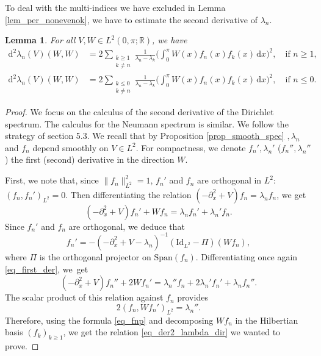 \documentclass[JEP,XML,SOM,Unicode,NoEqCountersInSection,published]{cedram}
\newtheorem{lemma}[theorem]{Lemma}
\theoremstyle{definition}
\begin{document}
To deal with the multi-indices we have excluded in Lemma \ref{lem_per_nonevenok}, we have to estimate the second derivative of $\lambda_n$.
\begin{lemma}
\label{lem_der2_lamb_abs}For all $V,W\in L^2(0,\pi;\mathbb{R})$, we have
\begin{align}
\label{eq_der2_lambda_dir}
\mathrm{d}^2\lambda_n(V)(W,W) &= 2\sum_{\substack{k \geq 1\\ k\neq n}} \frac1{\lambda_n - \lambda_k} \biggl(\int_0^\pi W(x) f_n(x) f_k(x) \, \mathrm{d}x \biggr)^2, \quad \text{if } n\geq 1,
\\
\label{eq_der2_lambda_neu}
\mathrm{d}^2\lambda_n(V)(W,W) &= 2\sum_{\substack{k \leq 0\\ k\neq n}} \frac1{\lambda_n - \lambda_k} \biggl(\int_0^\pi W(x) f_n(x) f_k(x) \, \mathrm{d}x \biggr)^2, \quad \text{if } n\leq 0.
\end{align}
\end{lemma}
\begin{proof}
We focus on the calculus of the second derivative of the Dirichlet spectrum. The calculus for the Neumann spectrum is similar. We follow the strategy of \cite{BG06} section 5.3. We recall that by Proposition \ref{prop_smooth_spec} $,\lambda_n$ and $f_n$ depend smoothly on $V\in L^2$. For compactness, we denote $f_n',\lambda_n'$ (\resp $f_n'',\lambda_n''$) the first (\resp second) derivative in the direction $W$.

First, we note that, since $\|f_n\|_{L^2}^2 \!=\! 1$, $f_n'$ and $f_n$ are orthogonal in $L^2$: $(f_n,f_n')_{L^2}\!=\!0$. Then differentiating the relation $(-\partial_x^2 +V)f_n = \lambda_n f_n $, we get
\begin{equation}
\label{eq_first_der}
(-\partial_x^2 +V)f_n' + W f_n= \lambda_n f_n' + \lambda_n' f_n.
\end{equation}
Since $f_n'$ and $f_n$ are orthogonal, we deduce that
\begin{equation}
\label{eq_fnp}
f_n'= -(-\partial_x^2 +V - \lambda_n)^{-1} (\mathrm{Id}_{L^2} - \Pi)(W f_n),
\end{equation}
where $\Pi$ is the orthogonal projector on $\mathrm{Span}(f_n)$. Differentiating once again \eqref{eq_first_der}, we~get
\[
(-\partial_x^2 +V)f_n'' +2 W f_n'=\lambda_n'' f_n + 2\lambda_n' f_n' +\lambda_n f_n''.
\]
The scalar product of this relation against $f_n$ provides
\[
2 (f_n,W f_n')_{L^2} = \lambda_n''.
\]
Therefore, using the formula \eqref{eq_fnp} and decomposing $W f_n$ in the Hilbertian basis $(f_k)_{k\geq 1}$, we get the relation \eqref{eq_der2_lambda_dir} we wanted to prove.
\end{proof}
\end{document}
